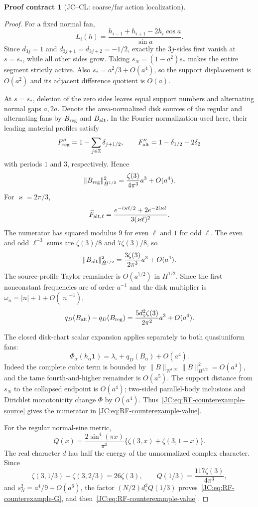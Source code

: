 \documentclass[11pt]{amsart}
\numberwithin{equation}{section}
\theoremstyle{definition}
\newtheorem{contract}[theorem]{Proof contract}
\theoremstyle{remark}
\begin{document}
\begin{contract}[JC--CL: coarse/far action localization]
\begin{proof}
For a fixed normal fan,
\[
 L_i(h)=\frac{h_{i-1}+h_{i+1}-2h_i\cos a}{\sin a}.
\]
Since \(d_{3j}=1\) and \(d_{3j+1}=d_{3j+2}=-1/2\), exactly the
\(3j\)-sides first vanish at \(s=s_*\), while all other sides grow.
Taking \(s_N=(1-a^2)s_*\) makes the entire segment strictly active.
Also \(s_*=a^2/3+O(a^4)\), so the support displacement is \(O(a^2)\)
and its adjacent difference quotient is \(O(a)\).

At \(s=s_*\), deletion of the zero sides leaves equal support numbers and
alternating normal gaps \(a,2a\).  Denote the area-normalized disk sources
of the regular and alternating fans by \(B_{\rm reg}\) and \(B_{\rm alt}\).
In the Fourier normalization used here, their leading material profiles
satisfy
\[
 F_{\rm reg}''=1-\sum_{j\in\mathbb Z}\delta_{j+1/2},
\qquad
 F_{\rm alt}''=1-\delta_{1/2}-2\delta_2
\]
with periods \(1\) and \(3\), respectively.  Hence
\[
 \|B_{\rm reg}\|_{\dot H^{1/2}}^2
 =\frac{\zeta(3)}{4\pi^3}a^3+O(a^4).
\]
For \(\varkappa=2\pi/3\),
\[
 \widehat F_{{\rm alt},\ell}
 =\frac{e^{-i\varkappa\ell/2}+2e^{-2i\varkappa\ell}}
 {3(\varkappa\ell)^2}.
\]
The numerator has squared modulus \(9\) for even \(\ell\) and \(1\) for
odd \(\ell\).  The even and odd \(\ell^{-3}\) sums are
\(\zeta(3)/8\) and \(7\zeta(3)/8\), so
\[
 \|B_{\rm alt}\|_{\dot H^{1/2}}^2
 =\frac{3\zeta(3)}{2\pi^3}a^3+O(a^4).
\]
The source-profile Taylor remainder is \(O(a^{7/2})\) in \(H^{1/2}\).
Since the first nonconstant frequencies are of order \(a^{-1}\) and the
disk multiplier is \(\omega_n=|n|+1+O(|n|^{-1})\),
\begin{equation}\label{JC:eq:RF-counterexample-source}
 q_D(B_{\rm alt})-q_D(B_{\rm reg})
 =\frac{5d_\circ^2\zeta(3)}{2\pi^2}a^3+O(a^4).
\end{equation}

The closed disk-chart scalar expansion applies separately to both
quasiuniform fans:
\[
 \Phi_\alpha(h_\alpha\mathbf1)
 =\lambda_\circ+q_D(B_\alpha)+O(a^4).
\]
Indeed the complete cubic term is bounded by
\(\|B\|_{W^{1,\infty}}\|B\|_{H^{1/2}}^2=O(a^4)\), and the tame
fourth-and-higher remainder is \(O(a^5)\).  The support distance from
\(s_N\) to the collapsed endpoint is \(O(a^4)\); two-sided parallel-body
inclusions and Dirichlet monotonicity change \(\Phi\) by \(O(a^4)\).
Thus~\eqref{JC:eq:RF-counterexample-source} gives the numerator in
\eqref{JC:eq:RF-counterexample-value}.

For the regular normal-sine metric,
\[
 Q(x)=\frac{2\sin^4(\pi x)}{\pi^3}
 \{\zeta(3,x)+\zeta(3,1-x)\}.
\]
The real character \(d\) has half the energy of the unnormalized complex
character.  Since
\[
 \zeta(3,1/3)+\zeta(3,2/3)=26\zeta(3),\qquad
 Q(1/3)=\frac{117\zeta(3)}{4\pi^3},
\]
and \(s_N^2=a^4/9+O(a^6)\), the factor
\((N/2)d_\circ^2Q(1/3)\) proves~\eqref{JC:eq:RF-counterexample-G}, and
then~\eqref{JC:eq:RF-counterexample-value}.


\end{proof}
\end{contract}
\end{document}

